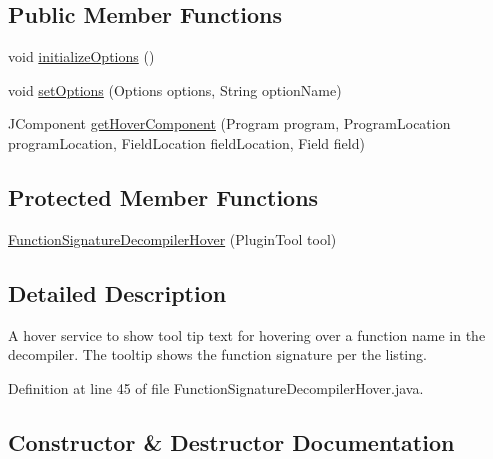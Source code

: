 \subsection*{Public Member Functions}
\begin{DoxyCompactItemize}
\item 
void \mbox{\hyperlink{classghidra_1_1app_1_1decompiler_1_1component_1_1hover_1_1_function_signature_decompiler_hover_a5acea5a447feb773d46ef4cad16c5cfb}{initialize\+Options}} ()
\item 
void \mbox{\hyperlink{classghidra_1_1app_1_1decompiler_1_1component_1_1hover_1_1_function_signature_decompiler_hover_a9cc0bb6ff1fac001b162655a97429a4f}{set\+Options}} (Options options, String option\+Name)
\item 
J\+Component \mbox{\hyperlink{classghidra_1_1app_1_1decompiler_1_1component_1_1hover_1_1_function_signature_decompiler_hover_ad02afaa8a3143ab0e63231a32ef9629e}{get\+Hover\+Component}} (Program program, Program\+Location program\+Location, Field\+Location field\+Location, Field field)
\end{DoxyCompactItemize}
\subsection*{Protected Member Functions}
\begin{DoxyCompactItemize}
\item 
\mbox{\hyperlink{classghidra_1_1app_1_1decompiler_1_1component_1_1hover_1_1_function_signature_decompiler_hover_a82c13abc54367a798dfce670965bd111}{Function\+Signature\+Decompiler\+Hover}} (Plugin\+Tool tool)
\end{DoxyCompactItemize}


\subsection{Detailed Description}
A hover service to show tool tip text for hovering over a function name in the decompiler. The tooltip shows the function signature per the listing. 

Definition at line 45 of file Function\+Signature\+Decompiler\+Hover.\+java.



\subsection{Constructor \& Destructor Documentation}
\mbox{\label{classghidra_1_1app_1_1decompiler_1_1component_1_1hover_1_1_function_signature_decompiler_hover_a82c13abc54367a798dfce670965bd111}} 
